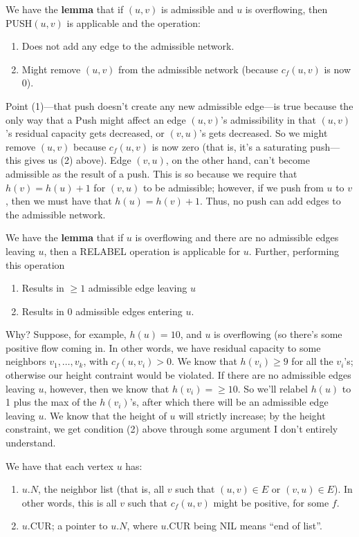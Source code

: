 \documentclass{article}
\begin{document}
We have the \textbf{lemma} that if $(u,v)$ is admissible and $u$
is overflowing, then PUSH$(u,v)$ is applicable and the operation:
\begin{enumerate}
	\item
	Does not add any edge to the admissible network.

	\item
	Might remove $(u,v)$ from the admissible network (because $c_f(u,v)$
	is now 0).
\end{enumerate}
Point (1)---that push doesn't create any new admissible edge---is true because
the only way that a Push might affect an edge $(u,v)$'s admissibility in 
that $(u,v)$'s residual capacity gets decreased, or $(v,u)$'s gets
decreased.
So we might remove $(u,v)$ because $c_f(u,v)$ is now zero (that is, it's
a saturating push---this gives us (2) above).
Edge $(v,u)$, on the other hand, can't become admissible as the result of a 
push.
This is so because we require that $h(v) = h(u) + 1$ for $(v,u)$ to be
admissible; however, if we push from $u$ to $v$, then we must have that
$h(u) = h(v) + 1$.
Thus, no push can add edges to the admissible network.

We have the \textbf{lemma} that if $u$ is overflowing and there
are no admissible edges leaving $u$, then a RELABEL operation is applicable for
$u$.
Further, performing this operation
\begin{enumerate}
	\item
	Results in $\geq 1$ admissible edge leaving $u$

	\item
	Results in 0 admissible edges entering $u$.
\end{enumerate}
Why? Suppose, for example, $h(u) = 10$, and $u$ is overflowing (so there's
some positive flow coming in.
In other words, we have residual capacity to some neighbors $v_1, \ldots, 
v_k$, with
$c_f(u,v_i) > 0$.
We know that $h(v_i) \geq 9$ for all the $v_i$'s; otherwise our height
contraint would be violated.
If there are no admissible edges leaving $u$, however, then we know that
$h(v_i) = \geq 10$.
So we'll relabel $h(u)$ to 1 plus the max of the $h(v_i)$'s, after which
there will be an admissible edge leaving $u$.
We know that the height of $u$ will strictly increase; by the
height constraint, we get condition (2) above through some argument I don't
entirely understand.

We have that each vertex $u$ has:
\begin{enumerate}
	\item
	$u.N$, the neighbor list (that is, all $v$ such that $(u,v)\in E$ or
	$(v,u)\in E$).
	In other words, this is all $v$ such that $c_f(u,v)$ might be positive,
	for some $f$.
	
	\item
	$u.$CUR; a pointer to $u.N$, where $u.$CUR being NIL means ``end of 
	list''.
\end{enumerate}
\end{document}
